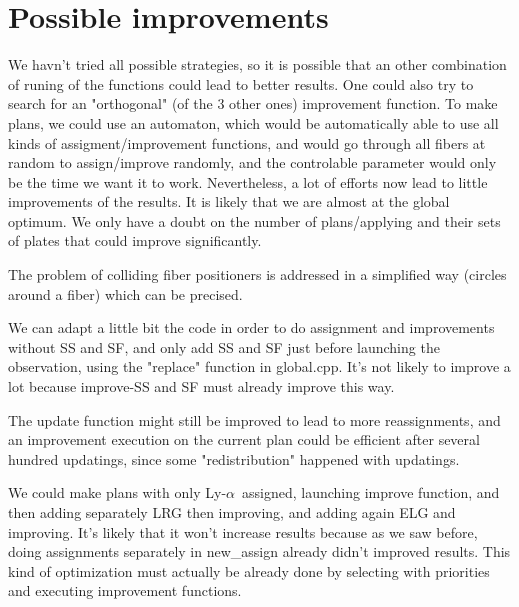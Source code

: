 \documentclass{extarticle}
\def\lya{Ly-$\alpha$\ }
\begin{document}

\section{Possible improvements}
We havn't tried all possible strategies, so it is possible that an other combination of runing of the functions could lead to better results.
One could also try to search for an "orthogonal" (of the 3 other ones) improvement function.
To make plans, we could use an automaton, which would be automatically able to use all kinds of assigment/improvement functions, and would go through all fibers at random to assign/improve randomly, and the controlable parameter would only be the time we want it to work.
Nevertheless, a lot of efforts now lead to little improvements of the results. It is likely that we are almost at the global optimum. We only have a doubt on the number of plans/applying and their sets of plates that could improve significantly.

The problem of colliding fiber positioners is addressed in a simplified way (circles around a fiber) which can be precised.

We can adapt a little bit the code in order to do assignment and improvements without SS and SF, and only add SS and SF just before launching the observation, using the "replace" function in global.cpp. It's not likely to improve a lot because improve-SS and SF must already improve this way.

The update function might still be improved to lead to more reassignments, and an improvement execution on the current plan could be efficient after several hundred updatings, since some "redistribution" happened with updatings.

We could make plans with only \lya assigned, launching improve function, and then adding separately LRG then improving, and adding again ELG and improving. It's likely that it won't increase results because as we saw before, doing assignments separately in new\_assign already didn't improved results. This kind of optimization must actually be already done by selecting with priorities and executing improvement functions.


{}
\end{document}
